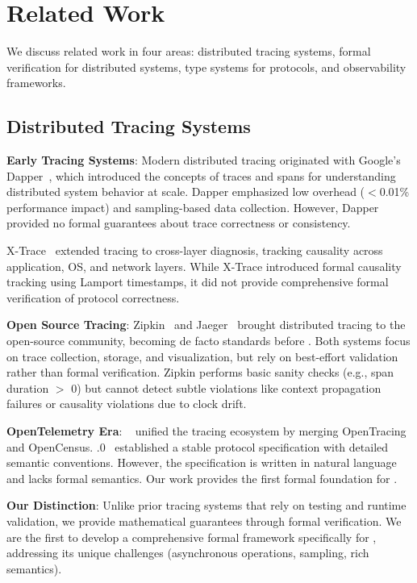 
\section{Related Work}
\label{sec:related}

We discuss related work in four areas: distributed tracing systems, formal verification for distributed systems, type systems for protocols, and observability frameworks.

\subsection{Distributed Tracing Systems}

\textbf{Early Tracing Systems}: Modern distributed tracing originated with Google's Dapper~\cite{sigelman2010dapper}, which introduced the concepts of traces and spans for understanding distributed system behavior at scale. Dapper emphasized low overhead ($<$0.01\% performance impact) and sampling-based data collection. However, Dapper provided no formal guarantees about trace correctness or consistency.

X-Trace~\cite{fonseca2007x-trace} extended tracing to cross-layer diagnosis, tracking causality across application, OS, and network layers. While X-Trace introduced formal causality tracking using Lamport timestamps, it did not provide comprehensive formal verification of protocol correctness.

\textbf{Open Source Tracing}: Zipkin~\cite{zipkin2012} and Jaeger~\cite{jaeger2017} brought distributed tracing to the open-source community, becoming de facto standards before \otel. Both systems focus on trace collection, storage, and visualization, but rely on best-effort validation rather than formal verification. Zipkin performs basic sanity checks (e.g., span duration $>$ 0) but cannot detect subtle violations like context propagation failures or causality violations due to clock drift.

\textbf{OpenTelemetry Era}: \otel~\cite{opentelemetry2019} unified the tracing ecosystem by merging OpenTracing and OpenCensus. .0~\cite{otlp2023} established a stable protocol specification with detailed semantic conventions. However, the specification is written in natural language and lacks formal semantics. Our work provides the first formal foundation for \otlp.

\textbf{Our Distinction}: Unlike prior tracing systems that rely on testing and runtime validation, we provide mathematical guarantees through formal verification. We are the first to develop a comprehensive formal framework specifically for \otlp, addressing its unique challenges (asynchronous operations, sampling, rich semantics).

